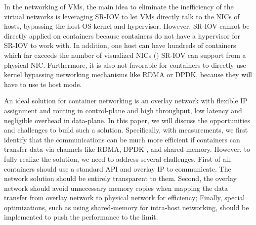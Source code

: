 In the networking of VMs, the main idea to eliminate the inefficiency of the virtual networks is leveraging SR-IOV to let VMs directly talk to the NICs of
hosts, bypassing the host OS kernel and hypervisor. 
However, SR-IOV cannot be directly applied on containers because containers 
do not have a hypervisor for SR-IOV to work with. In addition, one host can have
hundreds of containers which far exceeds the number of visualized NICs () SR-IOV can support from a physical NIC. Furthermore, it is also not
favorable for containers to directly use kernel bypassing networking mechanisms like RDMA or DPDK, because they will have to use te host mode. 

An ideal solution for container networking is an overlay network with flexible
IP assignment and routing in control-plane and high 
throughput, low latency and negligible overhead in data-plane. In this paper, we 
will discuss the opportunities and challenges to build such a solution. 
Specifically, with measurements, we first identify that the communications 
can be much more efficient if containers can transfer data via channels like
RDMA, DPDK , and shared-memory. However, to fully
realize the solution, we need to address several challenges. First of all, 
containers should use a standard API and overlay IP to communicate. The network
solution should be entirely transparent to them. Second, the overlay network
should avoid unnecessary memory copies when mapping the data transfer from
overlay network to physical network for efficiency; Finally, special optimizations, such as using shared-memory for intra-host networking, should be
implemented to push the performance to the limit. 
